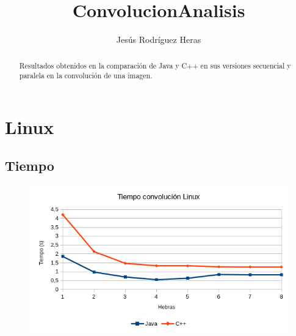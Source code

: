 \documentclass[12pt,letterpaper]{article}
\title{ConvolucionAnalisis}
\author{Jesús Rodríguez Heras}
\begin{document}
	
	\maketitle
	\begin{abstract} %
		\begin{center}
			Resultados obtenidos en la comparación de Java y C++ en sus versiones secuencial y paralela en la convolución de una imagen.
		\end{center}
	\end{abstract}
	\thispagestyle{empty}
	\newpage
	
	
	
	
	
	\lstset{language=bash, numbers=left, numberstyle=\tiny, numbersep=10pt, firstnumber=1, stepnumber=1, basicstyle=\small\ttfamily, tabsize=1, extendedchars=true, inputencoding=latin1}

\section{Linux}
\subsection{Tiempo}
\begin{figure}[h]
	\centering
	\includegraphics[scale=0.8]{TiempoLinux.png}
\end{figure}
\end{document}
